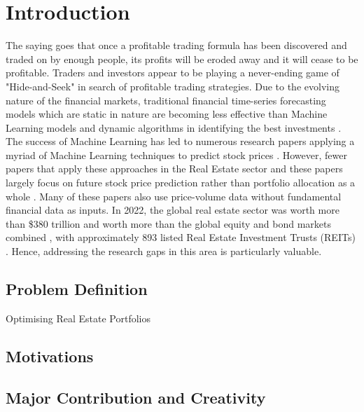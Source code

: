 \documentclass[a4paper,12pt]{report}
\renewcommand\thechapter{\Roman{chapter}}
\numberwithin{equation}{section}
\theoremstyle{definition}
\begin{document}
\tableofcontents


\setcounter{chapter}{1}
\renewcommand{\thechapter}{\arabic{chapter}}
\setcounter{chapter}{0}
\chapter{Introduction}
The saying goes that once a profitable trading formula has been discovered and traded on by enough people, its profits will be eroded away and it will cease to be profitable. Traders and investors appear to be playing a never-ending game of "Hide-and-Seek" in search of profitable trading strategies. Due to the evolving nature of the financial markets, traditional financial time-series forecasting models which are static in nature are becoming less effective than Machine Learning models and dynamic algorithms in identifying the best investments \citep{sheth_predicting_2023}. The success of Machine Learning has led to numerous research papers applying a myriad of Machine Learning techniques to predict stock prices \citep{obthong_survey_2020}. However, fewer papers that apply these approaches in the Real Estate sector and these papers largely focus on future stock price prediction rather than portfolio allocation as a whole \citep{habbab_-depth_2024}. Many of these papers also use price-volume data without fundamental financial data as inputs. In 2022, the global real estate sector was worth more than \$380 trillion and worth more than the global equity and bond markets combined \citep{tostevin_total_2023}, with approximately 893 listed Real Estate Investment Trusts (REITs) \citep{noauthor_global_2024}. Hence, addressing the research gaps in this area is particularly valuable.



\section{Problem Definition}
Optimising Real Estate Portfolios 




\section{Motivations}
\section{Major Contribution and Creativity}
\end{document}
